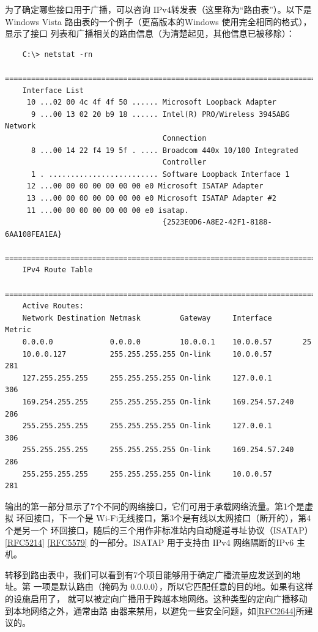 为了确定哪些接口用于广播，可以咨询 IPv4转发表（这里称为“路由表”）。以下是
Windows Vista 路由表的一个例子（更高版本的Windows 使用完全相同的格式），显示了接口
列表和广播相关的路由信息（为清楚起见，其他信息已被移除）：

\begin{verbatim}
    C:\> netstat -rn
    =======================================================================
    Interface List
     10 ...02 00 4c 4f 4f 50 ...... Microsoft Loopback Adapter
      9 ...00 13 02 20 b9 18 ...... Intel(R) PRO/Wireless 3945ABG Network
                                    Connection
      8 ...00 14 22 f4 19 5f . .... Broadcom 440x 10/100 Integrated
                                    Controller
      1 . ......................... Software Loopback Interface 1
     12 ...00 00 00 00 00 00 00 e0 Microsoft ISATAP Adapter
     13 ...00 00 00 00 00 00 00 e0 Microsoft ISATAP Adapter #2
     11 ...00 00 00 00 00 00 00 e0 isatap.
                                    {2523E0D6-A8E2-42F1-8188-6AA108FEA1EA}
    =======================================================================
    IPv4 Route Table
    =======================================================================
    Active Routes:
    Network Destination Netmask         Gateway     Interface       Metric
    0.0.0.0             0.0.0.0         10.0.0.1    10.0.0.57       25
    10.0.0.127          255.255.255.255 On-link     10.0.0.57       281
    127.255.255.255     255.255.255.255 On-link     127.0.0.1       306
    169.254.255.255     255.255.255.255 On-link     169.254.57.240  286
    255.255.255.255     255.255.255.255 On-link     127.0.0.1       306
    255.255.255.255     255.255.255.255 On-link     169.254.57.240  286
    255.255.255.255     255.255.255.255 On-link     10.0.0.57       281
\end{verbatim}

输出的第一部分显示了7个不同的网络接口，它们可用于承载网络流量。第1个是虚拟
环回接口，下一个是 Wi-Fi无线接口，第3个是有线以太网接口（断开的），第4个是另一个
环回接口，随后的三个用作非标准站内自动隧道寻址协议（ISATAP）\href{https://www.rfc-editor.org/rfc/rfc5214}{[RFC5214]}
\href{https://www.rfc-editor.org/rfc/rfc5579}{[RFC5579]}
的一部分。ISATAP 用于支持由 IPv4 网络隔断的IPv6 主机。

转移到路由表中，我们可以看到有7个项目能够用于确定广播流量应发送到的地址。第
一项是默认路由（掩码为 0.0.0.0），所以它匹配任意的目的地。如果有这样的设施启用了，
就可以被定向广播用于跨越本地网络。这种类型的定向广播移动到本地网络之外，通常由路
由器来禁用，以避免一些安全问题，如\href{https://www.rfc-editor.org/rfc/rfc2644}{[RFC2644]}所建议的。

